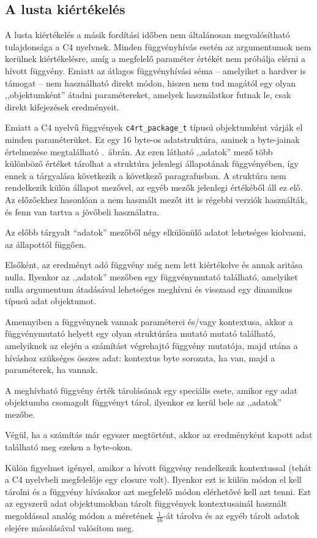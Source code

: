 \subsection{A lusta kiértékelés}\label{sec:c4:rt:pkg}

A lusta kiértékelés a másik fordítási időben nem általánosan megvalósítható tulajdonsága a C4 nyelvnek.
Minden függvényhívás esetén az argumentumok nem kerülnek kiértékelésre, amíg a megfelelő paraméter értékét nem próbálja elérni a hívott függvény.
Emiatt az átlagos függvényhívási séma -- amelyiket a hardver is támogat -- nem használható direkt módon, hiszen nem tud magától egy olyan ,,objektumként'' átadni paramétereket, amelyek használatkor futnak le, csak direkt kifejezések eredményeit.

Emiatt a C4 nyelvű függvények {\tt c4rt\_package\_t} típusú objektumként várják el minden paraméterüket.
Ez egy 16 byte-os adatstruktúra, aminek a byte-jainak értelmezése megtalálható .~ábrán.
Az ezen látható ,,adatok'' mező több különböző értéket tárolhat a struktúra jelenlegi állapotának függvényében, így ennek a tárgyalása következik a következő paragrafusban.
A struktúra nem rendelkezik külön állapot mezővel, az egyéb
mezők jelenlegi értékéből áll ez elő.
Az előzőekhez hasonlóan a nem használt mezőt itt is régebbi verziók használták, és fenn van tartva a jövőbeli használatra.

Az előbb tárgyalt ``adatok'' mezőből négy elkülönülő adatot lehetséges kiolvasni, az állapottól függően.

Elsőként, az eredményt adó függvény még nem lett kiértékelve és annak aritása nulla.
Ilyenkor az ,,adatok'' mezőben egy függvénymutató található, amelyiket nulla argumentum átadásával lehetséges meghívni és visszaad egy dinamikus típusú adat objektumot.

Amennyiben a függvénynek vannak paraméterei és/vagy kontextusa, akkor a függvénymutató helyett egy olyan struktúrára mutató mutató található, amelyiknek az elején a számítást végrehajtó függvény mutatója, majd utána a híváshoz szükséges összes adat: kontextus byte sorozata, ha van, majd a paraméterek, ha vannak.

A meghívható függvény érték tárolásának egy speciális esete, amikor egy adat objektumba csomagolt függvényt tárol, ilyenkor ez kerül bele az ,,adatok'' mezőbe.

Végül, ha a számítás már egyszer megtörtént, akkor az eredményként kapott adat található meg ezeken a byte-okon.

Külön figyelmet igényel, amikor a hívott függvény rendelkezik kontextussal (tehát a C4 nyelvbeli megfelelője egy closure volt).
Ilyenkor ezt is külön módon el kell tárolni és a függvény hívásakor azt megfelelő módon elérhetővé kell azt tenni.
Ezt az egyszerű adat objektumokban tárolt függvények kontextusainál használt megoldással analóg módon a méretének $\frac{1}{16}$-át tárolva és az egyéb tárolt adatok elejére másolásával valósítom meg.
